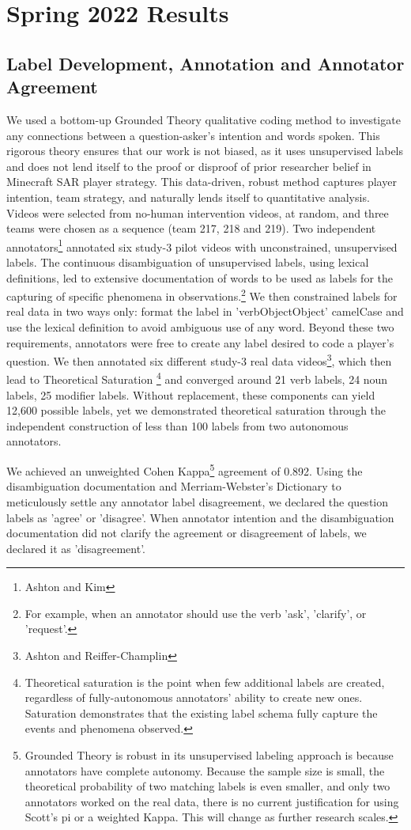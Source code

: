 \section{Spring 2022 Results}

\subsection{Label Development, Annotation and Annotator Agreement}

We used a bottom-up Grounded Theory qualitative coding method to investigate
any connections between a question-asker's intention and words spoken. This
rigorous theory ensures that our work is not biased, as it uses unsupervised
labels and does not lend itself to the proof or disproof of prior researcher
belief in Minecraft SAR player strategy. This data-driven, robust method
captures player intention, team strategy, and naturally lends itself to
quantitative analysis. Videos were selected from no-human intervention videos,
at random, and three teams were chosen as a sequence (team 217, 218 and 219).
Two independent annotators\footnote{Ashton and Kim} annotated six study-3 pilot
videos with unconstrained, unsupervised labels. The continuous disambiguation
of unsupervised labels, using lexical definitions, led to extensive
documentation of words to be used as labels for the capturing of specific
phenomena in observations.\footnote{For example, when an annotator should use
the verb 'ask', 'clarify', or 'request'.} We then constrained labels for real
data in two ways only: format the label in 'verbObjectObject' camelCase and use
the lexical definition to avoid ambiguous use of any word. Beyond these two
requirements, annotators were free to create any label desired to code a
player's question. We then annotated six different study-3 real data
videos\footnote{Ashton and Reiffer-Champlin}, which then lead to Theoretical
Saturation \footnote{Theoretical saturation is the point when few additional
labels are created, regardless of fully-autonomous annotators' ability to
create new ones. Saturation demonstrates that the existing label schema fully
capture the events and phenomena observed.} and converged around 21 verb
labels, 24 noun labels, 25 modifier labels. Without replacement, these
components can yield 12,600 possible labels, yet we demonstrated theoretical
saturation through the independent construction of less than 100 labels from
two autonomous annotators.

We achieved an unweighted Cohen Kappa\footnote{Grounded Theory is robust in its
unsupervised labeling approach is because annotators have complete autonomy.
Because the sample size is small, the theoretical probability of two matching
labels is even smaller, and only two annotators worked on the real data, there
is no current justification for using Scott's pi or a weighted Kappa. This will
change as further research scales.} agreement of 0.892. Using the
disambiguation documentation and Merriam-Webster's Dictionary to meticulously
settle any annotator label disagreement, we declared the question labels as
'agree' or 'disagree'. When annotator intention and the disambiguation
documentation did not clarify the agreement or disagreement of labels, we
declared it as 'disagreement'. 


